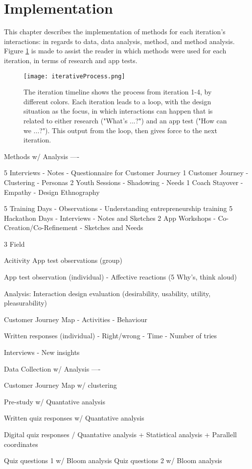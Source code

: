 \section{Implementation}

This chapter describes the implementation of methods for each iteration's interactions: in regards to data, data analysis, method, and method analysis. Figure \ref{fig:iterative-process} is made to assist the reader in which methods were used for each iteration, in terms of research and app tests.


\begin{figure}[h]
    \centering
    \texttt{[image: iterativeProcess.png]}
    \caption{The iteration timeline shows the process from iteration 1-4, by different colors. Each iteration leads to a loop, with the design situation as the focus, in which interactions can happen that is related to either research ("What's ...?") and an app test ("How can we ...?"). This output from the loop, then gives force to the next iteration.}
    \label{fig:iterative-process}
\end{figure}

Methods w/ Analysis
----

5 Interviews - Notes - Questionnaire for Customer Journey
1 Customer Journey - Clustering - Personas
2 Youth Sessions - Shadowing - Needs
1 Coach Stayover - Empathy - Design Ethnography

5 Training Days - Observations - Understanding entrepreneurship training
5 Hackathon Days - Interviews - Notes and Sketches
2 App Workshops - Co-Creation/Co-Refinement - Sketches and Needs

3 Field

Acitivity
App test observations (group)

App test observation (individual)
- Affective reactions (5 Why's, think aloud)

Analysis: Interaction design evaluation (desirability, usability, utility, pleasurability)

Customer Journey Map
- Activities
- Behaviour

Written responses (individual)
- Right/wrong
- Time
- Number of tries

Interviews
- New insights

Data Collection w/ Analysis
----

Customer Journey Map w/ clustering

Pre-study w/ Quantative analysis

Written quiz responses w/ Quantative analysis

Digital quiz responses / Quantative analysis + Statistical analysis + Parallell coordinates

Quiz questions 1 w/ Bloom analysis
Quiz questions 2 w/ Bloom analysis

%

%

%

%
